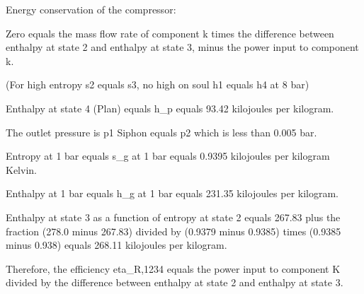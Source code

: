 Energy conservation of the compressor:

Zero equals the mass flow rate of component k times the difference between enthalpy at state 2 and enthalpy at state 3, minus the power input to component k.

(For high entropy s2 equals s3, no high on soul h1 equals h4 at 8 bar)

Enthalpy at state 4 (Plan) equals h_p equals 93.42 kilojoules per kilogram.

The outlet pressure is p1 Siphon equals p2 which is less than 0.005 bar.

Entropy at 1 bar equals s_g at 1 bar equals 0.9395 kilojoules per kilogram Kelvin.

Enthalpy at 1 bar equals h_g at 1 bar equals 231.35 kilojoules per kilogram.

Enthalpy at state 3 as a function of entropy at state 2 equals 267.83 plus the fraction (278.0 minus 267.83) divided by (0.9379 minus 0.9385) times (0.9385 minus 0.938) equals 268.11 kilojoules per kilogram.

Therefore, the efficiency eta_R,1234 equals the power input to component K divided by the difference between enthalpy at state 2 and enthalpy at state 3.